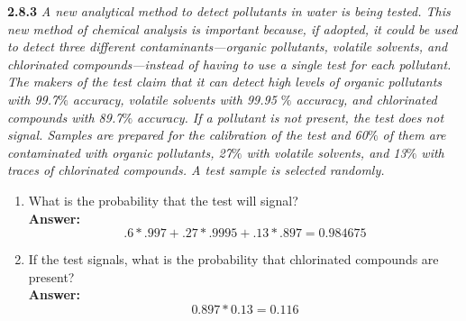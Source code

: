 \documentclass[11pt]{article}
\begin{document}
\noindent \textbf{2.8.3} \emph{A new analytical method to detect pollutants in water is being tested. This new method of chemical analysis is important because, if adopted, it could be used to detect three different contaminants—organic pollutants, volatile solvents, and chlorinated compounds—instead of having to use a single test for each pollutant. The makers of the test claim that it can detect high levels of organic pollutants with 99.7$\%$ accuracy, volatile solvents with 99.95 $\%$ accuracy, and chlorinated compounds with 89.7$\%$ accuracy. If a pollutant is not present, the test does not signal. Samples are prepared for the calibration of the test and 60$\%$ of them are contaminated with organic pollutants, 27$\%$ with volatile solvents, and 13$\%$ with traces of chlorinated compounds. A test sample is selected randomly.}
\begin{enumerate}
\item What is the probability that the test will signal?
\\\textbf{Answer: } 
\begin{equation}
.6 * .997 + .27 * .9995 + .13*.897 = 0.984675
\end{equation}
\item If the test signals, what is the probability that chlorinated compounds are present?
\\\textbf{Answer:}
\begin{equation}
0.897 * 0.13 = 0.116
\end{equation}
\end{enumerate}
\end{document}
